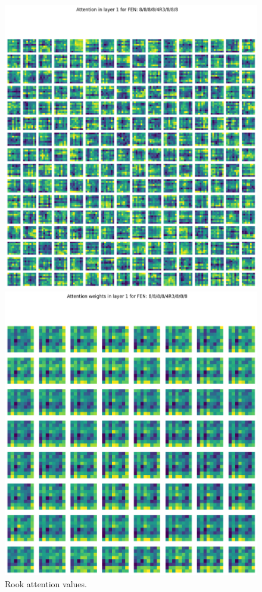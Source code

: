 \begin{figure}[H]
  \begin{minipage}{0.475\textwidth}
    \centering
    \includegraphics[width=\textwidth]{project/img/attention_maps/R_attention_1.png}
    \caption{Rook attention values.}
    \label{atnR1}
  \end{minipage}
  \hspace{0.05\textwidth}
  \begin{minipage}{0.475\textwidth}
    \centering
    \includegraphics[width=\textwidth]{project/img/attention_maps/R_weights_1.png}

\end{minipage}
\end{figure}
